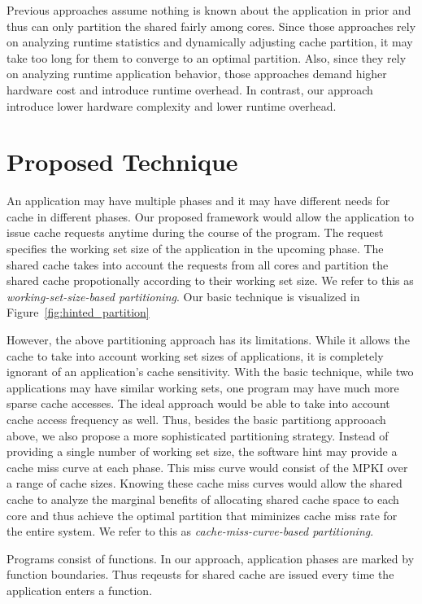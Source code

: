 \documentclass{acm_proc_article-sp}
\begin{document}
Previous approaches assume nothing is known about the application in prior and 
thus can only partition the shared fairly among cores. Since those approaches 
rely on analyzing runtime statistics and dynamically adjusting cache partition,
it may take too long for them to converge to an optimal partition. Also, since 
they rely on analyzing runtime application behavior, those approaches demand 
higher hardware cost and introduce runtime overhead. In contrast, our approach
introduce lower hardware complexity and lower runtime overhead.

\section{Proposed Technique}

An application may have multiple phases and it may have different needs for 
cache in different phases. Our proposed framework would allow the application to issue 
cache requests anytime during the course of the program. The request specifies 
the working set size of the application in the upcoming phase. The shared cache
takes into account the requests from all cores and partition the shared cache
propotionally according to their working set size. We refer to this as 
\emph{working-set-size-based partitioning}. Our basic technique is visualized 
in Figure~\ref{fig:hinted_partition}

However, the above partitioning approach has its limitations. While it allows the
cache to take into account working set sizes of applications, it is completely ignorant
of an application's cache sensitivity. With the basic technique, while two applications
may have similar working sets, one program may have much more sparse cache accesses.
The ideal approach would be able to take into account cache access frequency as well. 
Thus, besides the basic partitiong approoach above, we also propose a more 
sophisticated partitioning strategy. Instead of providing a single number of 
working set size, the software hint may provide a cache miss curve at each 
phase. This miss curve would consist of the MPKI over a range of cache sizes. 
Knowing these cache miss curves would allow the shared cache to analyze the 
marginal benefits of allocating shared cache space to each core and thus achieve
the optimal partition that miminizes cache miss rate for the entire system. We refer to this as 
\emph{cache-miss-curve-based partitioning}.

Programs consist of functions. In our approach, application phases are marked by
function boundaries. Thus reqeusts for shared cache are issued every time the 
application enters a function.
\end{document}
